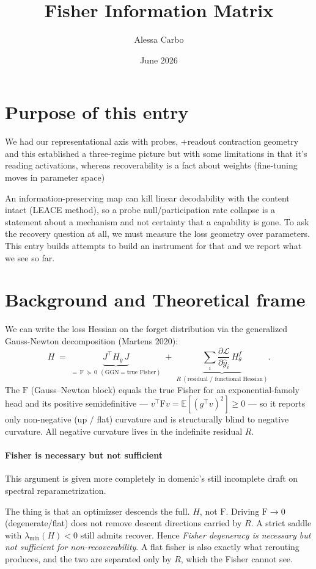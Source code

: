 \documentclass[11pt]{article}
\title{Fisher Information Matrix}
\author{Alessa Carbo}
\date{June 2026}
\newcommand{\Fisher}{\ensuremath{\mathrm{F}}}
\begin{document}
\section{Purpose of this entry}
We had our representational axis with probes, +readout contraction geometry and this established a three-regime picture but with some limitations in that it's reading activations, whereas recoverability is a fact about weights (fine-tuning moves in parameter space)

An information-preserving map can kill linear decodability with the content intact (LEACE method), so a probe null/participation rate collapse is a statement about a mechanism and not certainty that a capability is gone. To ask the recovery question at all, we must measure the loss geometry over parameters. This entry builds attempts to build an instrument for that and we report what we see so far. 



\section{Background and Theoretical frame}
We can write the loss Hessian on the forget distribution via the generalized Gauss-Newton decomposition (Martens 2020):
\begin{equation}
  H \;=\; \underbrace{J^\top H_{\hat y}\, J}_{=\,\Fisher\;\succeq\,0\ \ (\text{GGN} = \text{true Fisher})}
      \;+\; \underbrace{\textstyle\sum_i \frac{\partial \mathcal{L}}{\partial \hat y_i}\, H^{f}_\theta}_{R\ (\text{residual / functional Hessian})}.
\end{equation}
The $\Fisher$ (Gauss--Newton block) equals the true Fisher for an exponential-famoly head and its positive semidefinitive --- $v^\top \Fisher v = \mathbb{E}[(g^\top v)^2] \ge 0$ --- so it
reports only non-negative (up / flat) curvature and is structurally blind to negative curvature.
All negative curvature lives in the indefinite residual $R$.

\paragraph{Fisher is necessary but not sufficient} This argument is given more completely in domenic's still incomplete draft on spectral reparametrization. 

The thing is that an optimizser descends the full. $H$, not
$\Fisher$. Driving $\Fisher \to 0$ (degenerate/flat) does not remove descent directions carried by $R$. A strict saddle with  $\lambda_{\min}(H)<0$ still admits recover. Hence \emph{Fisher degeneracy is necessary but not sufficient for non-recoverability}. A flat fisher is also exactly what rerouting produces, and the two are separated only by $R$, which the Fisher cannot see. 
\end{document}
